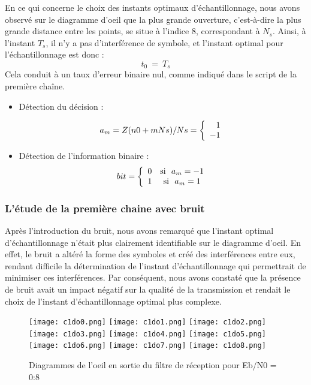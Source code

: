 \documentclass[11pt]{article}
\begin{document}
    En ce qui concerne le choix des instants optimaux d'échantillonnage, nous avons observé sur le diagramme d'oeil que la plus grande ouverture, c'est-à-dire la plus grande distance entre les points, se situe à l'indice 8, correspondant à $N_s$. Ainsi, à l'instant $T_s$, il n'y a pas d'interférence de symbole, et l'instant optimal pour l'échantillonnage est donc : 
    $$t_0 \ = \ T_s$$
    Cela conduit à un taux d'erreur binaire nul, comme indiqué dans le script de la première chaîne.
\begin{itemize}
    \item Détection du décision :  \par
    
    \[
a_{m} = Z(n0 + mNs)/Ns = 
\left \{
   \begin{array}{r c l}
      1 \\
      -1
   \end{array}
\right .
\]

    \item Détection de l'information binaire : 
    \[
bit =  
\left \{
   \begin{array}{r c l}
      0 & \text{si } \ a_{m} =  -1\\
      1 & \text{si } \ a_{m} = 1 \\
     
   \end{array}
\right .
\]

    
\end{itemize}

\subsubsection{L'étude de la première chaine avec bruit}

Après l'introduction du bruit, nous avons remarqué que l'instant optimal d'échantillonnage n'était plus clairement identifiable sur le diagramme d'oeil. En effet, le bruit a altéré la forme des symboles et créé des interférences entre eux, rendant difficile la détermination de l'instant d'échantillonnage qui permettrait de minimiser ces interférences. Par conséquent, nous avons constaté que la présence de bruit avait un impact négatif sur la qualité de la transmission et rendait le choix de l'instant d'échantillonnage optimal plus complexe. 


\begin{figure}[ht!]
            \centering
            \texttt{[image: c1do0.png]}
            \texttt{[image: c1do1.png]}
            \texttt{[image: c1do2.png]}
            \texttt{[image: c1do3.png]}
            \texttt{[image: c1do4.png]}
            \texttt{[image: c1do5.png]}
            \texttt{[image: c1do6.png]}
            \texttt{[image: c1do7.png]}
            \texttt{[image: c1do8.png]}
            \caption{ Diagrammes de l’oeil en sortie du filtre de réception pour Eb/N0 = 0:8
            \label{fig : Oeil}}
\end{figure}
\end{document}
